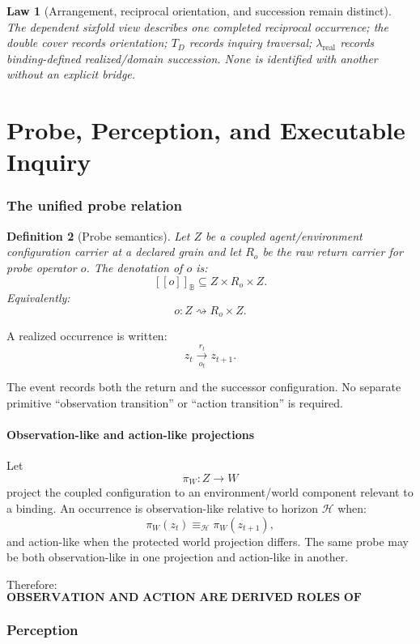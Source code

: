 \documentclass[11pt,oneside]{article}
\newtheorem{definition}{Definition}[section]
\newtheorem{law}[definition]{Law}
\newcommand{\B}{\mathbb B}
\newcommand{\den}[1]{[\![#1]\!]}
\begin{document}
\begin{law}[Arrangement, reciprocal orientation, and succession remain distinct]
The dependent sixfold view describes one completed reciprocal occurrence; the double cover records orientation; \(T_D\) records inquiry traversal; \(\lambda_{\mathrm{real}}\) records binding-defined realized/domain succession.  None is identified with another without an explicit bridge.
\end{law}

\part{Probe, Perception, and Executable Inquiry}

\section{The unified probe relation}

\begin{definition}[Probe semantics]
Let \(Z\) be a coupled agent/environment configuration carrier at a declared grain and let \(R_o\) be the raw return carrier for probe operator \(o\).  The denotation of \(o\) is:
\[
\boxed{
\den{o}_{\B}
\subseteq
Z\times R_o\times Z.
}
\]
Equivalently:
\[
o:Z\rightsquigarrow R_o\times Z.
\]
\end{definition}

A realized occurrence is written:
\[
\boxed{
z_t\xrightarrow[o_t]{r_t}z_{t+1}.
}
\]

The event records both the return and the successor configuration.  No separate primitive ``observation transition'' or ``action transition'' is required.

\subsection{Observation-like and action-like projections}

Let
\[
\pi_W:Z\to W
\]
project the coupled configuration to an environment/world component relevant to a binding.  An occurrence is observation-like relative to horizon \(\mathcal H\) when:
\[
\pi_W(z_t)\equiv_{\mathcal H}\pi_W(z_{t+1}),
\]
and action-like when the protected world projection differs.  The same probe may be both observation-like in one projection and action-like in another.

Therefore:
\[
\boxed{
\textbf{OBSERVATION AND ACTION ARE DERIVED ROLES OF PROBING.}
}
\]

\section{Perception}
\end{document}
